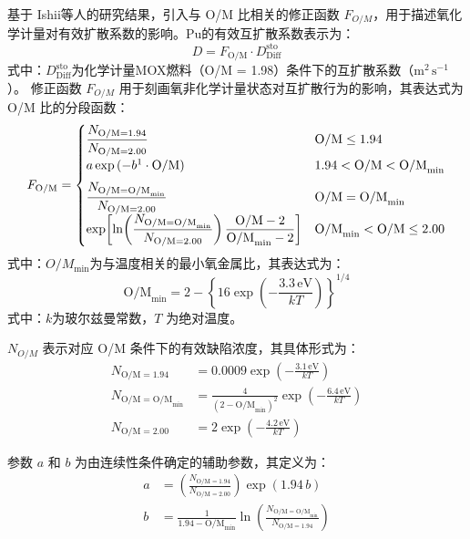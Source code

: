 基于 Ishii\cite{ishiiInvestigationPuMigration2001}等人的研究结果，引入与 O/M 比相关的修正函数 $F_{O/M}$，用于描述氧化学计量对有效扩散系数的影响。Pu的有效互扩散系数表示为：
\begin{equation}
	D = F_{\mathrm{O/M}} \cdot D^{\mathrm{sto}}_{\mathrm{Diff}}
\end{equation}
\noindent 式中：$D^{\mathrm{sto}}_{\mathrm{Diff}}$为化学计量MOX燃料（O/M = 1.98）条件下的互扩散系数（$\mathrm{m^2\,s^{-1}}$）。
修正函数 $F_{O/M}$ 用于刻画氧非化学计量状态对互扩散行为的影响，其表达式为 O/M 比的分段函数：
\begin{equation}
	F_{\mathrm{O/M}} =
	\begin{cases}
		\dfrac{N_{\mathrm{O/M}=1.94}}{N_{\mathrm{O/M}=2.00}} & \mathrm{O/M} \leq 1.94 \\[6pt]
		a \exp\left(-{b}\footnotemark\cdot{\mathrm{O/M}}\right) & 1.94 < \mathrm{O/M} < \mathrm{O/M}_{\min} \\[6pt]
		\dfrac{N_{\mathrm{O/M}=\mathrm{O/M}_{\min}}}{N_{\mathrm{O/M}=2.00}} & \mathrm{O/M} = \mathrm{O/M}_{\min} \\[6pt]
		\exp\!\left[
		\ln\!\left(\dfrac{N_{\mathrm{O/M}=\mathrm{O/M}_{\min}}}{N_{\mathrm{O/M}=2.00}}\right)
		\dfrac{\mathrm{O/M} - 2}{\mathrm{O/M}_{\min} - 2}
		\right] & \mathrm{O/M}_{\min} < \mathrm{O/M} \leq 2.00
	\end{cases}
\end{equation}
\noindent 式中：$O/M_{\min}$为与温度相关的最小氧金属比，其表达式为：
\begin{equation}
	\mathrm{O/M}_{\min} = 2 - \left\{16 \exp\left(-\frac{3.3\,\mathrm{eV}}{kT}\right)\right\}^{1/4}
\end{equation}
\noindent 式中：$k$为玻尔兹曼常数，$T$ 为绝对温度。

$N_{O/M}$ 表示对应 O/M 条件下的有效缺陷浓度，其具体形式为：
\begin{align}
	N_{\mathrm{O/M}=1.94} &= 0.0009 \exp\left(-\frac{3.1\,\mathrm{eV}}{kT}\right) \\
	N_{\mathrm{O/M}=\mathrm{O/M}_{\min}} &= \frac{4}{(2 - \mathrm{O/M}_{\min})^{2}} \exp\left(-\frac{6.4\,\mathrm{eV}}{kT}\right) \\
	N_{\mathrm{O/M}=2.00} &= 2 \exp\left(-\frac{4.2\,\mathrm{eV}}{kT}\right)
\end{align}

参数 $a$ 和 $b$ 为由连续性条件确定的辅助参数，其定义为：
\begin{align}
	a &= \left(\frac{N_{\mathrm{O/M}=1.94}}{N_{\mathrm{O/M}=2.00}}\right)\exp(1.94\,b) \\
	b &= \frac{1}{1.94 - \mathrm{O/M}_{\min}}
	\ln\left(\frac{N_{\mathrm{O/M}=\mathrm{O/M}_{\min}}}{N_{\mathrm{O/M}=1.94}}\right)
\end{align}

